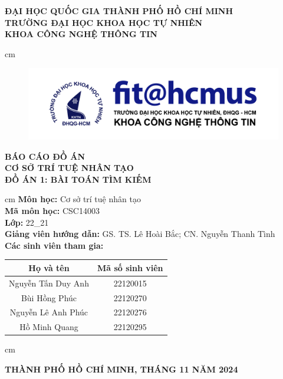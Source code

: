 \begin{titlepage}
	\begin{mybox}
		\begin{center}
			\fontsize{12}{12}\selectfont
			\textbf{ĐẠI HỌC QUỐC GIA THÀNH PHỐ HỒ CHÍ MINH}\\
			\textbf{TRƯỜNG ĐẠI HỌC KHOA HỌC TỰ NHIÊN}\\
			\textbf{KHOA CÔNG NGHỆ THÔNG TIN}
		\end{center}
		 cm
		\begin{figure}[H]
			\begin{center}
				\includegraphics[scale=0.5]{figures/fit-logo-chuan-V3}
			\end{center}
		\end{figure}
		\vskip 0.5cm
		\begin{center}
			\fontsize{16}{12}\selectfont
			\textbf{BÁO CÁO ĐỒ ÁN}\\
			\fontsize{24}{20}\selectfont
			\textbf{CƠ SỞ TRÍ TUỆ NHÂN TẠO}\\
			\fontsize{16}{12}\selectfont
			\textbf{ĐỒ ÁN 1: BÀI TOÁN TÌM KIẾM}
		\end{center}
		 cm
		\fontsize{14}{12}\selectfont
		\textbf{Môn học:} Cơ sở trí tuệ nhân tạo\\
		\textbf{Mã môn học:} CSC14003\\
		\textbf{Lớp:} 22\_21\\
		\textbf{Giảng viên hướng dẫn:} GS. TS. Lê Hoài Bắc; CN. Nguyễn Thanh Tình\\
		\textbf{Các sinh viên tham gia:}
		\begin{center}
			\begin{tabular}{|c|c|}
				\hline
				\textbf{Họ và tên} & \textbf{Mã số sinh viên}\\
				\hline
				Nguyễn Tấn Duy Anh & 22120015\\
				\hline
				Bùi Hồng Phúc & 22120270\\
				\hline
				Nguyễn Lê Anh Phúc & 22120276\\
				\hline
				Hồ Minh Quang & 22120295\\
				\hline
			\end{tabular}
		\end{center}
		 cm
		\begin{center}
			\textbf{THÀNH PHỐ HỒ CHÍ MINH, THÁNG 11 NĂM 2024}
		\end{center}
	\end{mybox}
\end{titlepage}